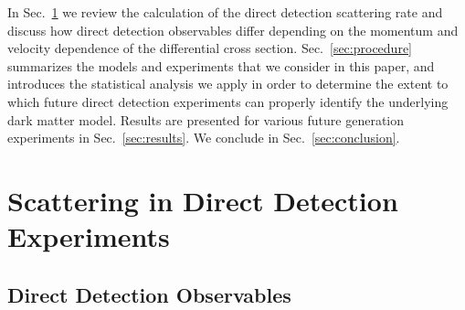 \documentclass[11pt]{article}
\newcommand{\Sec}[1]{Sec.~\ref{#1}} \newcommand{\Secs}[2]{Secs.~\ref{#1} and \ref{#2}} \newcommand{\Secm}[2]{Secs.~\ref{#1} through \ref{#2}}
\begin{document}






In \Sec{sec:dd} we review the calculation of the direct detection scattering rate and discuss how direct detection observables differ depending on the momentum and velocity dependence of the differential cross section. \Sec{sec:procedure} summarizes the models and experiments that we consider in this paper, and introduces the statistical analysis we apply in order to determine the extent to which future direct detection experiments can properly identify the underlying dark matter model. Results are presented for various future generation experiments in \Sec{sec:results}. We conclude in \Sec{sec:conclusion}.

  

\section{Scattering in Direct Detection Experiments}\label{sec:dd}

\subsection{Direct Detection Observables}
\end{document}
